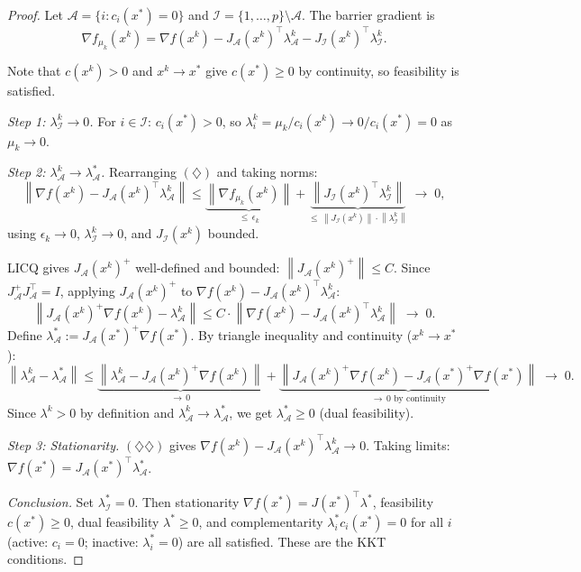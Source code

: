 \documentclass[11pt,a4paper]{report}
\theoremstyle{plain}
\theoremstyle{definition}
\newcommand{\norm}[1]{\left\lVert#1\right\rVert}
\newcommand{\grad}{\nabla}
\newcommand{\trans}{^{\top}}
\begin{document}
\begin{proof}
Let $\mathcal{A} = \{i : c_i(x^*) = 0\}$ and $\mathcal{I} = \{1,\ldots,p\}\setminus\mathcal{A}$. The barrier gradient is
\[
\grad f_{\mu_k}(x^k) = \grad f(x^k) - J_\mathcal{A}(x^k)\trans\lambda^k_\mathcal{A} - J_\mathcal{I}(x^k)\trans\lambda^k_\mathcal{I}. \tag{$\diamondsuit$}
\]
 
Note that $c(x^k) > 0$ and $x^k \to x^*$ give $c(x^*) \geq 0$ by continuity, so feasibility is satisfied.
 
\textit{Step 1: $\lambda^k_\mathcal{I} \to 0$.}\;
For $i \in \mathcal{I}$: $c_i(x^*) > 0$, so $\lambda^k_i = \mu_k/c_i(x^k) \to 0/c_i(x^*) = 0$ as $\mu_k \to 0$.
 
\textit{Step 2: $\lambda^k_\mathcal{A} \to \lambda^*_\mathcal{A}$.}\;
Rearranging $(\diamondsuit)$ and taking norms:
\[
\norm{\grad f(x^k) - J_\mathcal{A}(x^k)\trans\lambda^k_\mathcal{A}} \leq \underbrace{\norm{\grad f_{\mu_k}(x^k)}}_{\leq\,\epsilon_k} + \underbrace{\norm{J_\mathcal{I}(x^k)\trans\lambda^k_\mathcal{I}}}_{\leq\,\norm{J_\mathcal{I}(x^k)}\cdot\norm{\lambda^k_\mathcal{I}}} \;\longrightarrow\; 0, \tag{$\diamondsuit\diamondsuit$}
\]
using $\epsilon_k \to 0$, $\lambda^k_\mathcal{I} \to 0$, and $J_\mathcal{I}(x^k)$ bounded.
 
LICQ gives $J_\mathcal{A}(x^k)^+$ well-defined and bounded: $\norm{J_\mathcal{A}(x^k)^+} \leq C$. Since $J_\mathcal{A}^+ J_\mathcal{A}\trans = I$, applying $J_\mathcal{A}(x^k)^+$ to $\grad f(x^k) - J_\mathcal{A}(x^k)\trans\lambda^k_\mathcal{A}$:
\[
\norm{J_\mathcal{A}(x^k)^+\grad f(x^k) - \lambda^k_\mathcal{A}} \leq C \cdot \norm{\grad f(x^k) - J_\mathcal{A}(x^k)\trans\lambda^k_\mathcal{A}} \;\longrightarrow\; 0.
\]
Define $\lambda^*_\mathcal{A} := J_\mathcal{A}(x^*)^+\grad f(x^*)$. By triangle inequality and continuity ($x^k \to x^*$):
\[
\norm{\lambda^k_\mathcal{A} - \lambda^*_\mathcal{A}} \leq \underbrace{\norm{\lambda^k_\mathcal{A} - J_\mathcal{A}(x^k)^+\grad f(x^k)}}_{\to\,0} + \underbrace{\norm{J_\mathcal{A}(x^k)^+\grad f(x^k) - J_\mathcal{A}(x^*)^+\grad f(x^*)}}_{\to\,0\text{ by continuity}} \;\longrightarrow\; 0.
\]
Since $\lambda^k > 0$ by definition and $\lambda^k_\mathcal{A} \to \lambda^*_\mathcal{A}$, we get $\lambda^*_\mathcal{A} \geq 0$ (dual feasibility).
 
\textit{Step 3: Stationarity.}\;
$(\diamondsuit\diamondsuit)$ gives $\grad f(x^k) - J_\mathcal{A}(x^k)\trans\lambda^k_\mathcal{A} \to 0$. Taking limits: $\grad f(x^*) = J_\mathcal{A}(x^*)\trans\lambda^*_\mathcal{A}$.
 
\textit{Conclusion.}\;
Set $\lambda^*_\mathcal{I} = 0$. Then stationarity $\grad f(x^*) = J(x^*)\trans\lambda^*$, feasibility $c(x^*) \geq 0$, dual feasibility $\lambda^* \geq 0$, and complementarity $\lambda^*_i c_i(x^*) = 0$ for all $i$ (active: $c_i = 0$; inactive: $\lambda^*_i = 0$) are all satisfied. These are the KKT conditions.

\end{proof}
\end{document}
